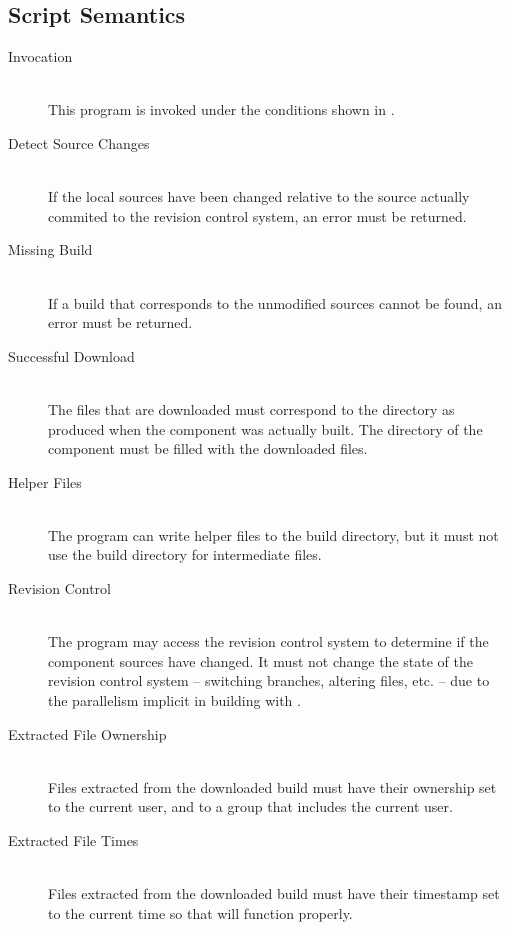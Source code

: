 \subsection{Script Semantics}

\begin{description}
\item[Invocation] \mbox{} \\

  This program is invoked under the conditions shown in
  .

\item[Detect Source Changes] \mbox{} \\

  If the local sources have been changed relative to the source
  actually commited to the revision control system, an error must be
  returned.

\item[Missing Build] \mbox{} \\

  If a build that corresponds to the unmodified sources cannot be
  found, an error must be returned.

\item[Successful Download] \mbox{} \\

  The files that are downloaded must correspond to the \destdir
  directory as produced when the component was actually built.  The
  \destdir directory of the component must be filled with the
  downloaded files.

\item[Helper Files] \mbox{} \\

  The program can write helper files to the build directory, but it
  must not use the build directory for intermediate files.

\item[Revision Control] \mbox{} \\

  The program may access the revision control system to determine if
  the component sources have changed.  It must not change the state of
  the revision control system -- switching branches, altering files,
  etc. -- due to the parallelism implicit in building with \lmsbw.

\item[Extracted File Ownership] \mbox{} \\

  Files extracted from the downloaded build must have their ownership
  set to the current user, and to a group that includes the current
  user.

\item[Extracted File Times] \mbox{} \\

  Files extracted from the downloaded build must have their timestamp
  set to the current time so that \make will function properly.

\end{description}

